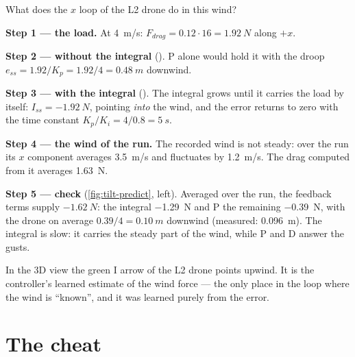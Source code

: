 \begin{example}
\label{ex:tilt-l2}
What does the $x$ loop of the L2 drone do in this wind?

\textbf{Step 1 — the load.} At \SI{4}{m/s}: $F_{drag} = 0.12 \cdot 16 = \SI{1.92}{N}$ along $+x$.

\textbf{Step 2 — without the integral} (). P alone would hold it with the droop $e_{ss} = 1.92/K_p = 1.92/4 = \SI{0.48}{m}$ downwind.

\textbf{Step 3 — with the integral} (). The integral grows until it carries the load by itself: $I_{ss} = \SI{-1.92}{N}$, pointing \emph{into} the wind, and the error returns to zero with the time constant $K_p/K_i = 4/0.8 = \SI{5}{s}$.

\textbf{Step 4 — the wind of the run.} The recorded wind is not steady: over the run its $x$ component averages \SI{3.5}{m/s} and fluctuates by \SI{1.2}{m/s}. The drag computed from it averages \SI{1.63}{N}.

\textbf{Step 5 — check} (\cref{fig:tilt-predict}, left). Averaged over the run, the feedback terms supply $\SI{-1.62}{N}$: the integral \SI{-1.29}{N} and P the remaining \SI{-0.39}{N}, with the drone on average $0.39/4 = \SI{0.10}{m}$ downwind (measured: \SI{0.096}{m}). The integral is slow: it carries the steady part of the wind, while P and D answer the gusts.
\end{example}


\begin{keyidea}
In the 3D view the green I arrow of the L2 drone points upwind. It is the controller's learned estimate of the wind force — the only place in the loop where the wind is \enquote{known}, and it was learned purely from the error.
\end{keyidea}

\section{The cheat}

